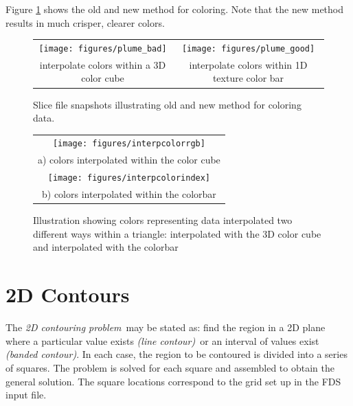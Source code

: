 \documentclass[11pt,twoside]{book}
\newcommand{\figoptions}{htp}
\begin{document}
Figure \ref{fignewslice} shows the old and new method for coloring.  Note that the new method results in much crisper, clearer colors.
\begin{figure}[\figoptions]
\begin{center}
\begin{tabular}{cc}
\texttt{[image: figures/plume\_bad]}&\texttt{[image: figures/plume\_good]}\\
interpolate colors within a 3D color cube&interpolate colors within 1D texture color bar\\
\end{tabular}
\caption [Slice file snapshots illustrating old and new method for
coloring data.] {Slice file snapshots illustrating old and new
method for coloring data.}
\label{fignewslice}%
\end{center}
\end{figure}



\begin{figure}[\figoptions]
\begin{center}
\begin{tabular}{c}
\texttt{[image: figures/interpcolorrgb]}\\
a) colors interpolated within the color cube\\
\texttt{[image: figures/interpcolorindex]}\\
b) colors interpolated within the colorbar\\
\end{tabular}
\end{center}
\caption[Color interpolation examples]
{Illustration showing colors representing data interpolated two different ways within a triangle: interpolated with the 3D color cube and interpolated with the colorbar}
\label{colorinterp}%
\end{figure}

%
%

\section{2D Contours}

The {\em 2D contouring problem}\ may be stated as: find the region in a 2D plane where a particular value exists {\em (line contour)}\ or an interval of values exist {\em (banded contour)}.   In each case, the  region to be contoured is divided into a series of squares.  The problem is solved for each square and assembled to obtain the general solution.  The square locations correspond to the grid set up in the FDS input file.
\end{document}
